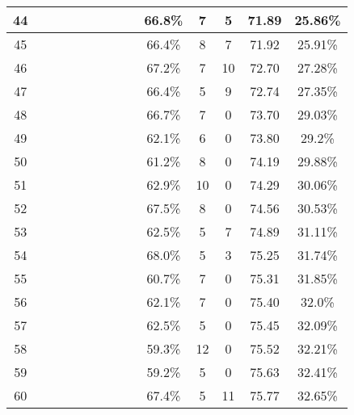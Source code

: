 \begin{longtable}{|c|c|c|c|c|c|c|c|c|c|c|c|c|c|}
44 &  \x    & \x    & \x    &       & \x\m  & \x\m  &       & \x\m  & 66.8\% &  7  & 5  & 71.89 & 25.86\% \\ \hline
45 &  \x    & \x    & \x    & \x    & \x\m  & \x    &       & \x    & 66.4\% &  8  & 7  & 71.92 & 25.91\% \\ \hline
46 &  \x    & \x    & \x    &       & \x\m  &       &       & \x\m  & 67.2\% &  7  & 10 & 72.70 & 27.28\% \\ \hline
47 &  \x    & \x    & \x    &       & \x\m  & \x    &       & \x    & 66.4\% &  5  & 9  & 72.74 & 27.35\% \\ \hline
48 &  \x    & \x    & \x    & \x    & \x\m  &       &       &       & 66.7\% &  7  & 0  & 73.70 & 29.03\% \\ \hline
49 &  \x    & \x    & \x    & \x    &       & \x    & \x\m  &       & 62.1\% &  6  & 0  & 73.80 & 29.2\% \\ \hline
50 &  \x    & \x    & \x    & \x    &       & \x\m  & \x\m  &       & 61.2\% &  8  & 0  & 74.19 & 29.88\% \\ \hline
51 &  \x    & \x    & \x    & \x    & \x    &       & \x\m  &       & 62.9\% &  10 & 0  & 74.29 & 30.06\% \\ \hline
52 &  \x    & \x    & \x    &       & \x\m  & \x    &       &       & 67.5\% &  8  & 0  & 74.56 & 30.53\% \\ \hline
53 &  \x    & \x    & \x    &       & \x    & \x\m  & \x\m  &       & 62.5\% &  5  & 7  & 74.89 & 31.11\% \\ \hline
54 &  \x    & \x    & \x    &       & \x\m  & \x    &       & \x\m  & 68.0\% &  5  & 3  & 75.25 & 31.74\% \\ \hline
55 &  \x    & \x    & \x    & \x    &       & \x\m  &       & \x\m  & 60.7\% &  7  & 0  & 75.31 & 31.85\% \\ \hline
56 &  \x    & \x    & \x    & \x    & \x    & \x    & \x\m  &       & 62.1\% &  7  & 0  & 75.40 & 32.0\% \\ \hline
57 &  \x    & \x    & \x    & \x    & \x    & \x\m  &       &       & 62.5\% &  5  & 0  & 75.45 & 32.09\% \\ \hline
58 &  \x    & \x    & \x    &       &       &       &       & \x\m  & 59.3\% &  12 & 0  & 75.52 & 32.21\% \\ \hline
59 &  \x    & \x    & \x    &       &       & \x    &       &       & 59.2\% &  5  & 0  & 75.63 & 32.41\% \\ \hline
60 &  \x    & \x    & \x    &       & \x\m  &       &       &       & 67.4\% &  5  & 11 & 75.77 & 32.65\% \\ \hline

\end{longtable}
